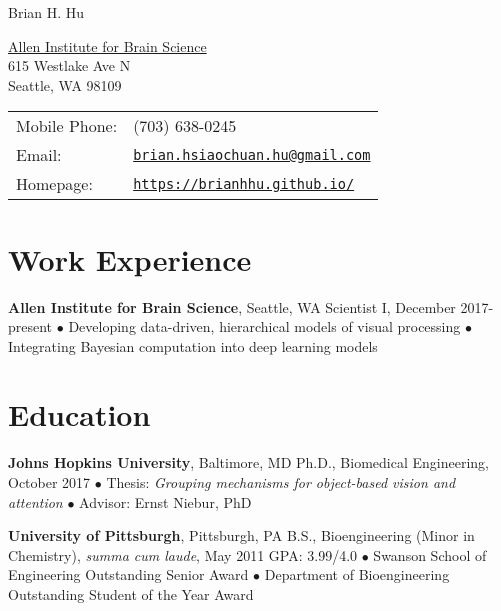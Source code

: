 \documentclass[10pt,letterpaper]{article}
\def\name{Brian H. Hu}
\renewenvironment{itemize}{
  \begin{list}{}{
    \setlength{\leftmargin}{1.5em}
    \setlength{\itemsep}{0.25em}
    \setlength{\parskip}{0pt}
    \setlength{\parsep}{0.25em}
  }
}{
  \end{list}
}
\begin{document}
{\huge \name}


\vspace{0.25in}

\begin{minipage}{0.475\linewidth}
  \href{https://www.alleninstitute.org/what-we-do/brain-science/}{Allen Institute for Brain Science} \\
  615 Westlake Ave N \\
  Seattle, WA 98109
\end{minipage}
\begin{minipage}{0.52\linewidth}
  \begin{tabular}{ll}
    Mobile Phone: & (703) 638-0245 \\
    Email: & \href{mailto:brian.hsiaochuan.hu@gmail.com}{\tt brian.hsiaochuan.hu@gmail.com} \\
    Homepage: & \href{https://brianhhu.github.io/}{\tt https://brianhhu.github.io/} \\
  \end{tabular}
\end{minipage}

\section*{Work Experience}
\vspace{-0.05in}
\begin{itemize}
  \item \textbf{Allen Institute for Brain Science}, Seattle, WA
  \subitem Scientist I, December 2017-present
  \subitem$\bullet$ Developing data-driven, hierarchical models of visual processing
  \subitem$\bullet$ Integrating Bayesian computation into deep learning models
\end{itemize}

\vspace{-0.25in}

\section*{Education}
\vspace{-0.05in}
\begin{itemize}
  \item \textbf{Johns Hopkins University}, Baltimore, MD
  \subitem Ph.D., Biomedical Engineering, October 2017
  \subitem$\bullet$ Thesis: \textit{Grouping mechanisms for object-based vision and attention}
  \subitem$\bullet$ Advisor: Ernst Niebur, PhD
  
  \item \textbf{University of Pittsburgh}, Pittsburgh, PA
  \subitem B.S., Bioengineering (Minor in Chemistry), \textit{summa cum laude}, May 2011
  \subitem GPA: 3.99/4.0
  \vspace{0.05in}
  \subitem$\bullet$ Swanson School of Engineering Outstanding Senior Award
  \subitem$\bullet$ Department of Bioengineering Outstanding Student of the Year Award
\end{itemize}
\end{document}
